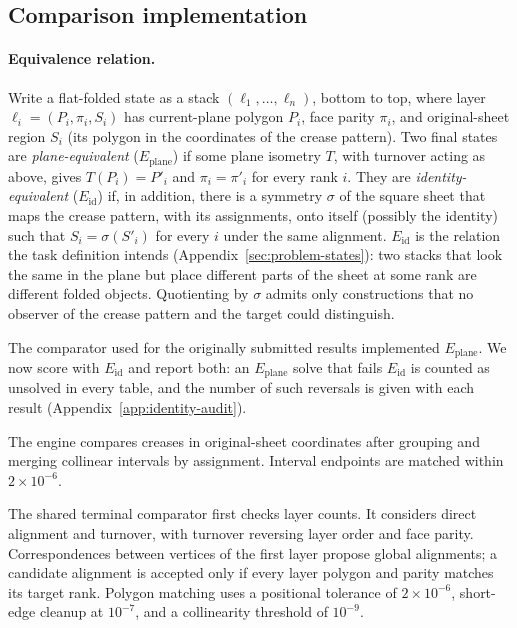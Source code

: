 \subsection{Comparison implementation}
\label{app:comparison-details}

\paragraph{Equivalence relation.} Write a flat-folded state as a stack $(\ell_1,\dots,\ell_n)$,
bottom to top, where layer $\ell_i=(P_i,\pi_i,S_i)$ has current-plane polygon $P_i$, face parity
$\pi_i$, and original-sheet region $S_i$ (its polygon in the coordinates of the crease pattern).
Two final states are \emph{plane-equivalent} ($E_{\mathrm{plane}}$) if some plane isometry $T$,
with turnover acting as above, gives $T(P_i)=P'_i$ and $\pi_i=\pi'_i$ for every rank $i$.
They are \emph{identity-equivalent} ($E_{\mathrm{id}}$) if, in addition, there is a symmetry
$\sigma$ of the square sheet that maps the crease pattern, with its assignments, onto itself
(possibly the identity) such that $S_i=\sigma(S'_i)$ for every $i$ under the same alignment.
$E_{\mathrm{id}}$ is the relation the task definition intends (Appendix~\ref{sec:problem-states}):
two stacks that look the same in the plane but place different parts of the sheet at some rank
are different folded objects. Quotienting by $\sigma$ admits only constructions that no observer
of the crease pattern and the target could distinguish.

The comparator used for the originally submitted results implemented $E_{\mathrm{plane}}$. We now
score with $E_{\mathrm{id}}$ and report both: an $E_{\mathrm{plane}}$ solve that fails
$E_{\mathrm{id}}$ is counted as unsolved in every table, and the number of such reversals is
given with each result (Appendix~\ref{app:identity-audit}).

The engine compares creases in original-sheet coordinates after grouping and merging collinear
intervals by assignment. Interval endpoints are matched within $2\times10^{-6}$.

The shared terminal comparator first checks layer counts. It considers direct alignment and
turnover, with turnover reversing layer order and face parity. Correspondences between vertices
of the first layer propose global alignments; a candidate alignment is accepted only if every
layer polygon and parity matches its target rank. Polygon matching uses a positional tolerance
of $2\times10^{-6}$, short-edge cleanup at $10^{-7}$, and a collinearity threshold of $10^{-9}$.

